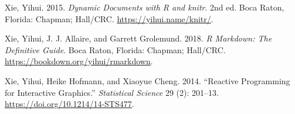 \documentclass{article}
\newlength{\cslhangindent}
\newlength{\cslentryspacingunit} %
\newenvironment{CSLReferences}[2] %
 {%
  \setlength{\parindent}{0pt}
  \ifodd #1
  \let\oldpar\par
  \def\par{\hangindent=\cslhangindent\oldpar}
  \fi
  \setlength{\parskip}{#2\cslentryspacingunit}
 }%
 {}
\begin{document}
\begin{CSLReferences}{1}{0}
\leavevmode\hypertarget{ref-knitr}{}%
Xie, Yihui. 2015. \emph{Dynamic Documents with {R} and {knitr}}. 2nd ed. Boca Raton, Florida: Chapman; Hall/CRC. \url{https://yihui.name/knitr/}.

\leavevmode\hypertarget{ref-rmarkdown}{}%
Xie, Yihui, J. J. Allaire, and Garrett Grolemund. 2018. \emph{R Markdown: The Definitive Guide}. Boca Raton, Florida: Chapman; Hall/CRC. \url{https://bookdown.org/yihui/rmarkdown}.

\leavevmode\hypertarget{ref-xie2014reactive}{}%
Xie, Yihui, Heike Hofmann, and Xiaoyue Cheng. 2014. {``{Reactive Programming for Interactive Graphics}.''} \emph{Statistical Science} 29 (2): 201--13. \url{https://doi.org/10.1214/14-STS477}.

\end{CSLReferences}



\end{document}
